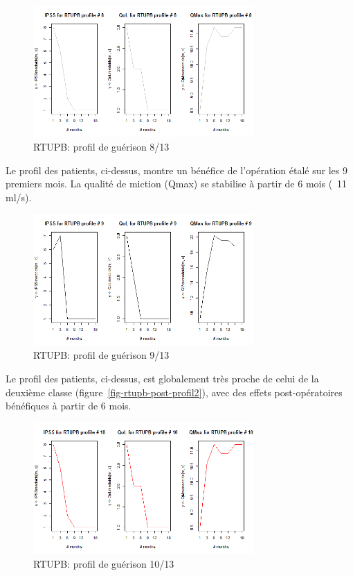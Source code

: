 \begin{figure}[H]
\centering
\includegraphics[width=0.75\textwidth]{../Fig/RTUPB/rtupb-profil-post-08.png}
\caption[]{RTUPB: profil de guérison 8/13}
\label{fig-rtupb-post-profil8}
\end{figure}

Le profil des patients, ci-dessus, montre un bénéfice de l'opération étalé sur les 9 premiers mois. La qualité de miction (Qmax) se stabilise à partir de 6 mois (~11 ml/s).

\begin{figure}[H]
\centering
\includegraphics[width=0.75\textwidth]{../Fig/RTUPB/rtupb-profil-post-09.png}
\caption[]{RTUPB: profil de guérison 9/13}
\label{fig-rtupb-post-profil9}
\end{figure}

Le profil des patients, ci-dessus, est globalement très proche de celui de la deuxième classe (figure~\ref{fig-rtupb-post-profil2}), avec des effets post-opératoires bénéfiques à partir de 6 mois.

\begin{figure}[H]
\centering
\includegraphics[width=0.75\textwidth]{../Fig/RTUPB/rtupb-profil-post-10.png}
\caption[]{RTUPB: profil de guérison 10/13}
\label{fig-rtupb-post-profil10}
\end{figure}


